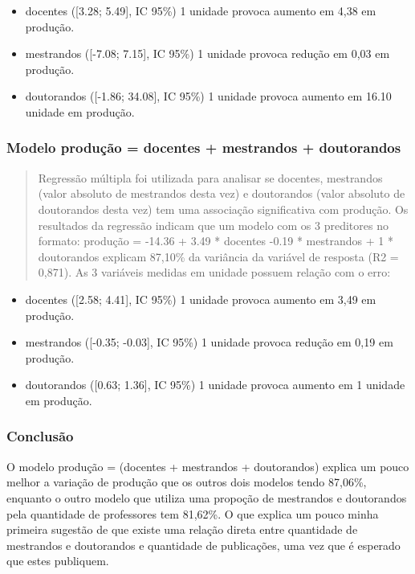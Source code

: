 \documentclass[
]{article}
\providecommand{\tightlist}{%
  \setlength{\itemsep}{0pt}\setlength{\parskip}{0pt}}
\begin{document}
\begin{itemize}
\tightlist
\item
  docentes ({[}3.28; 5.49{]}, IC 95\%) 1 unidade provoca aumento em 4,38
  em produção.
\item
  mestrandos ({[}-7.08; 7.15{]}, IC 95\%) 1 unidade provoca redução em
  0,03 em produção.
\item
  doutorandos ({[}-1.86; 34.08{]}, IC 95\%) 1 unidade provoca aumento em
  16.10 unidade em produção.
\end{itemize}

\hypertarget{modelo-produuxe7uxe3o-docentes-mestrandos-doutorandos}{%
\subsubsection{Modelo produção = docentes + mestrandos +
doutorandos}\label{modelo-produuxe7uxe3o-docentes-mestrandos-doutorandos}}

\begin{quote}
Regressão múltipla foi utilizada para analisar se docentes, mestrandos
(valor absoluto de mestrandos desta vez) e doutorandos (valor absoluto
de doutorandos desta vez) tem uma associação significativa com produção.
Os resultados da regressão indicam que um modelo com os 3 preditores no
formato: produção = -14.36 + 3.49 * docentes -0.19 * mestrandos + 1 *
doutorandos explicam 87,10\% da variância da variável de resposta (R2 =
0,871). As 3 variáveis medidas em unidade possuem relação com o erro:
\end{quote}

\begin{itemize}
\tightlist
\item
  docentes ({[}2.58; 4.41{]}, IC 95\%) 1 unidade provoca aumento em 3,49
  em produção.
\item
  mestrandos ({[}-0.35; -0.03{]}, IC 95\%) 1 unidade provoca redução em
  0,19 em produção.
\item
  doutorandos ({[}0.63; 1.36{]}, IC 95\%) 1 unidade provoca aumento em 1
  unidade em produção.
\end{itemize}

\hypertarget{conclusuxe3o}{%
\subsubsection{Conclusão}\label{conclusuxe3o}}

O modelo produção = (docentes + mestrandos + doutorandos) explica um
pouco melhor a variação de produção que os outros dois modelos tendo
87,06\%, enquanto o outro modelo que utiliza uma propoção de mestrandos
e doutorandos pela quantidade de professores tem 81,62\%. O que explica
um pouco minha primeira sugestão de que existe uma relação direta entre
quantidade de mestrandos e doutorandos e quantidade de publicações, uma
vez que é esperado que estes publiquem.
\end{document}
